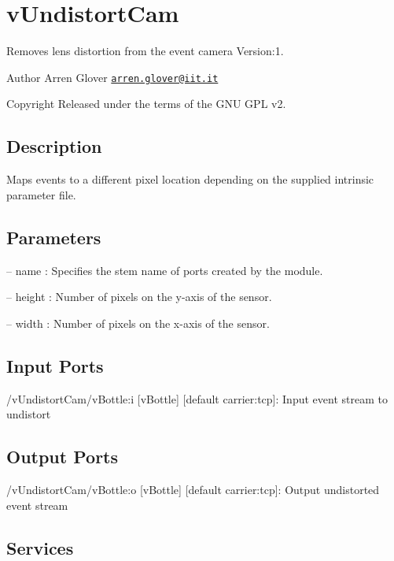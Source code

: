 \hypertarget{group__vUndistortCam}{}\section{v\+Undistort\+Cam}
\label{group__vUndistortCam}
Removes lens distortion from the event camera Version\+:1. \begin{DoxyAuthor}{Author}
Arren Glover \href{mailto:arren.glover@iit.it}{\tt arren.\+glover@iit.\+it} ~\newline
 
\end{DoxyAuthor}
\begin{DoxyCopyright}{Copyright}
Released under the terms of the G\+NU G\+PL v2. 
\end{DoxyCopyright}
\hypertarget{group__zynqGrabber_intro_sec}{}\subsection{Description}\label{group__zynqGrabber_intro_sec}
Maps events to a different pixel location depending on the supplied intrinsic parameter file.\hypertarget{group__zynqGrabber_parameters_sec}{}\subsection{Parameters}\label{group__zynqGrabber_parameters_sec}

\begin{DoxyItemize}
\item -- name \+: Specifies the stem name of ports created by the module.
\item -- height \+: Number of pixels on the y-\/axis of the sensor.
\item -- width \+: Number of pixels on the x-\/axis of the sensor. 
\end{DoxyItemize}\hypertarget{group__zynqGrabber_inputports_sec}{}\subsection{Input Ports}\label{group__zynqGrabber_inputports_sec}

\begin{DoxyItemize}
\item /v\+Undistort\+Cam/v\+Bottle\+:i \mbox{[}v\+Bottle\mbox{]} \mbox{[}default carrier\+:tcp\mbox{]}\+: Input event stream to undistort
\end{DoxyItemize}\hypertarget{group__zynqGrabber_outputports_sec}{}\subsection{Output Ports}\label{group__zynqGrabber_outputports_sec}

\begin{DoxyItemize}
\item /v\+Undistort\+Cam/v\+Bottle\+:o \mbox{[}v\+Bottle\mbox{]} \mbox{[}default carrier\+:tcp\mbox{]}\+: Output undistorted event stream
\end{DoxyItemize}\hypertarget{group__zynqGrabber_services_sec}{}\subsection{Services}\label{group__zynqGrabber_services_sec}
